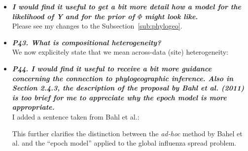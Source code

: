\documentclass[english]{article}
\begin{document}
\begin{itemize}
\item {
{\it
\textbf{
I would find it useful to get a bit more detail how a model for the likelihood of Y and for the prior of $\Phi$ might look like.
}%
}%
}%
\\
Please see my changes to the Subsection~\ref{sub:phylogeo}.




\item {
{\it
\textbf{
P43. What is compositional heterogeneity?
}%
}%
}%
\\
We now explicitely state that we mean across-data (site) heterogeneity:

\begin{quote}
\myeditsvfifteen
\end{quote}


\item {
{\it
\textbf{
P44. I would find it useful to receive a bit more guidance concerning the connection to phylogeographic inference. 
Also in Section 2.4.3, the description of the proposal by Bahl et al. (2011) is too brief for me to appreciate why the epoch model is more appropriate.
}%
}%
}%
\\
I added a sentence taken from Bahl et al.:

\begin{quote}
\myeditsvsixteen
\end{quote}

This further clarifies the distinction between the \emph{ad-hoc} method by Bahel et al. and the ``epoch model'' applied to the global influenza spread problem.


\end{itemize}
\end{document}
